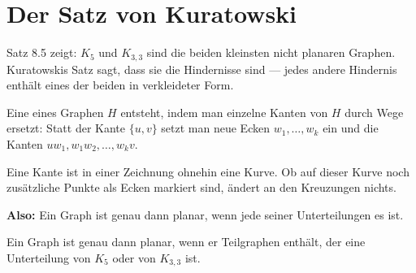 \section{Der Satz von Kuratowski}

Satz 8.5 zeigt: $K_5$ und $K_{3,3}$ sind die beiden kleinsten nicht planaren Graphen. Kuratowskis Satz sagt, dass sie die  Hindernisse sind --- jedes andere Hindernis enthält eines der beiden in verkleideter Form.

\begin{definition}
Eine  eines Graphen $H$ entsteht, indem man einzelne Kanten von $H$ durch Wege ersetzt: Statt der Kante $\{u,v\}$ setzt man neue Ecken $w_1, \ldots, w_k$ ein und die Kanten $uw_1, w_1w_2, \ldots, w_kv$.
\end{definition}

\begin{merksatz}
\begin{center}
\end{center}

Eine Kante ist in einer Zeichnung ohnehin eine Kurve. Ob auf dieser Kurve noch zusätzliche Punkte als Ecken markiert sind, ändert an den Kreuzungen nichts.

\textbf{Also:} Ein Graph ist genau dann planar, wenn jede seiner Unterteilungen es ist.
\end{merksatz}

\begin{merksatz}
Ein Graph ist genau dann planar, wenn er  Teilgraphen enthält, der eine Unterteilung von $K_5$ oder von $K_{3,3}$ ist.
\end{merksatz}

